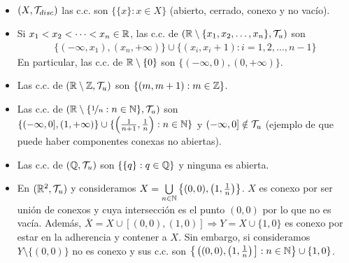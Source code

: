 \begin{ejemplo}\
    \begin{itemize}
        \item $(X, \mathcal{T}_{disc})$ las c.c. son $\{\{x\}:x\in X\}$ (abierto, cerrado, conexo y no vacío).
        \item Si $x_1<x_2<\dots<x_n \in \mathbb{R}$, las c.c. de $(\mathbb{R}\setminus \{x_1,x_2,\dots,x_n\}, \mathcal{T}_u)$ son 
        \begin{align*}
        \{(-\infty, x_1), (x_n, +\infty)\}\cup\{(x_i, x_i+1):i=1,2,\dots,n-1\}
        \end{align*}
        En particular, las c.c. de $\mathbb{R}\setminus \{0\}$ son $\{(-\infty,0),(0,+\infty)\}$. 
        \item Las c.c. de $(\mathbb{R}\setminus \mathbb{Z}, \mathcal{T}_u)$ son $\{(m,m+1):m\in \mathbb{Z}\}$.
        \item Las c.c. de $(\mathbb{R}\setminus \{\nicefrac{1}{n}:n\in \mathbb{N}\}, \mathcal{T}_u)$ son $\{(-\infty, 0], (1, +\infty)\}\cup \{\left(\frac{1}{n+1}, \frac{1}{n}\right):n\in \mathbb{N}\}$ y $(-\infty,0] \notin \mathcal{T}_u$ (ejemplo de que puede haber componentes conexas no abiertas).
        \item Las c.c. de $(\mathbb{Q}, \mathcal{T}_u)$ son $\{\{q\}:q\in \mathbb{Q}\}$ y ninguna es abierta.
        \item En $(\mathbb{R}^2, \mathcal{T}_u)$ y consideramos $X=\bigcup\limits_{n\in \mathbb{N}}\left\{(0,0), \left(1, \frac{1}{n}\right)\right\}$. $X$ es conexo por ser unión de conexos y cuya intersección es el punto $(0,0)$ por lo que no es vacía. Además, $\overline{X}=X\cup [(0,0),(1,0)]\Rightarrow Y = X \cup \{1,0\}$ es conexo por estar en la adherencia y contener a $X$. Sin embargo, si consideramos $Y\setminus \{(0,0)\}$ no es conexo y sus c.c. son $\left\{ \left.\left((0,0), \left(1, \frac{1}{n}\right)\right.\right] : n\in \mathbb{N} \right\}\cup \{1,0\}$.
    \end{itemize}
    \endsquare
\end{ejemplo}

